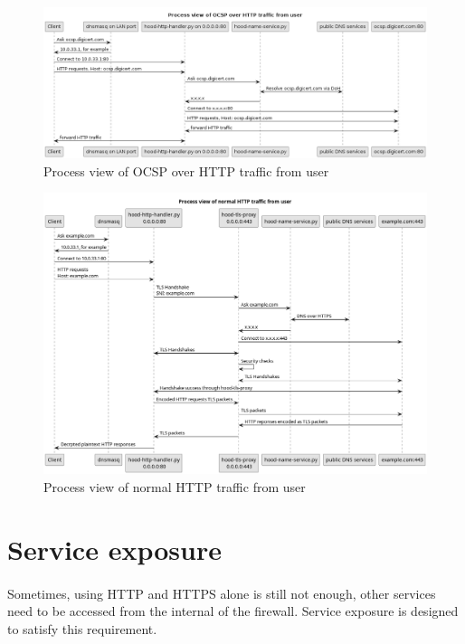 \documentclass[mscthesis]{usiinfthesis}
\begin{document}
\begin{figure}[H]
  \includegraphics[width=\textheight, angle=90]{graphics/puml/process-ocsp-traffic.png}
  \caption{Process view of OCSP over HTTP traffic from user}
  \label{fig:ocsp-process-view}
\end{figure}

\begin{figure}[H]
  \includegraphics[width=\textheight, angle=90]{graphics/puml/process-http-traffic.png}
  \caption{Process view of normal HTTP traffic from user}
  \label{fig:http-process-view}
\end{figure}

\section{Service exposure}
\paragraph{}
Sometimes, using HTTP and HTTPS alone is still not enough, other services need to be accessed from the internal of the firewall. Service exposure is designed to satisfy this requirement.
\end{document}
